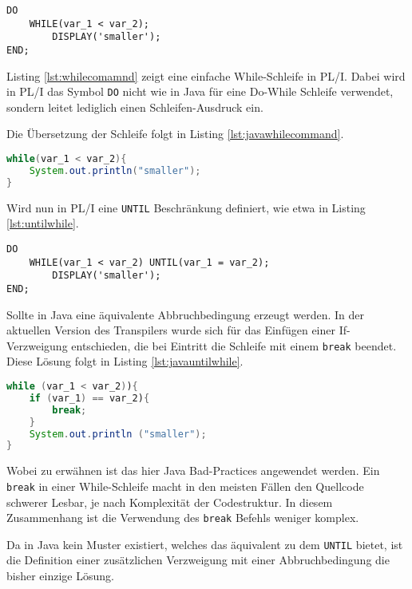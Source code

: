 \begin{lstlisting}[language=PL/I, caption=PL/I IF-Else Statement, label={lst:whilecomamnd}]
DO 
	WHILE(var_1 < var_2);
		DISPLAY('smaller');
END;
\end{lstlisting} 

Listing \ref{lst:whilecomamnd} zeigt eine einfache While-Schleife in PL/I.
Dabei wird in PL/I das Symbol \verb+DO+ nicht wie in Java für eine Do-While
Schleife verwendet, sondern leitet lediglich einen Schleifen-Ausdruck ein.

Die Übersetzung der Schleife folgt in Listing \ref{lst:javawhilecommand}.

\begin{lstlisting}[language=Java, caption=Java While-Statement, label={lst:javawhilecommand}]
while(var_1 < var_2){
	System.out.println("smaller");
}
\end{lstlisting} 

Wird nun in PL/I eine \verb+UNTIL+ Beschränkung definiert, wie etwa in Listing
\ref{lst:untilwhile}.

\begin{lstlisting}[language=PL/I, caption=PL/I IF-ELSE Statement, label={lst:untilwhile}]
DO 
	WHILE(var_1 < var_2) UNTIL(var_1 = var_2);
		DISPLAY('smaller');
END;
\end{lstlisting} 

Sollte in Java eine äquivalente Abbruchbedingung erzeugt werden.
In der aktuellen Version des Transpilers wurde sich für das Einfügen einer If-Verzweigung entschieden, die bei Eintritt die Schleife mit einem \verb+break+ beendet. Diese Lösung folgt in Listing \ref{lst:javauntilwhile}.

\begin{lstlisting}[language=Java, caption=Java Until-Statement, label={lst:javauntilwhile}]
while (var_1 < var_2)){
	if (var_1) == var_2){
		break; 
	}
	System.out.println ("smaller");
}

\end{lstlisting} 

Wobei zu erwähnen ist das hier Java Bad-Practices angewendet werden. Ein \verb+break+ in einer While-Schleife macht in den meisten Fällen den Quellcode schwerer Lesbar, je nach Komplexität der Codestruktur.
In diesem Zusammenhang ist die Verwendung des \verb+break+ Befehls weniger komplex. 

Da in Java kein Muster existiert, welches das äquivalent zu dem \verb+UNTIL+ bietet, ist die Definition einer zusätzlichen Verzweigung mit einer Abbruchbedingung die bisher einzige Lösung.

